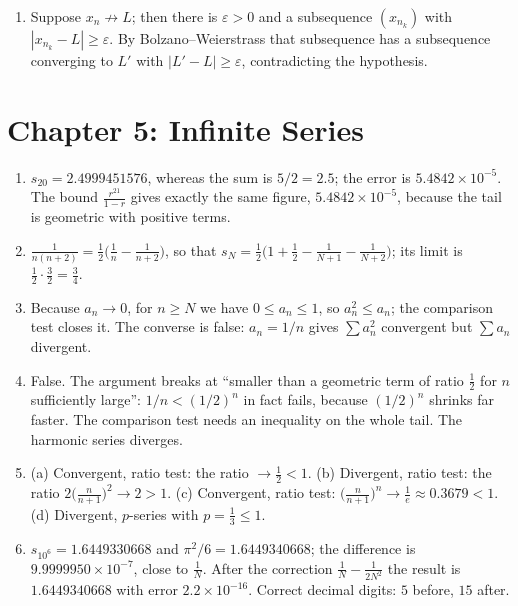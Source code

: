 \begin{enumerate}[label=\textbf{4.\arabic*}]
  \item Suppose $x_{n}\not\to L$; then there is $\varepsilon>0$ and a subsequence
        $(x_{n_{k}})$ with $|x_{n_{k}}-L|\ge\varepsilon$. By
        Bolzano--Weierstrass that subsequence has a subsequence converging to $L'$ with
        $|L'-L|\ge\varepsilon$, contradicting the hypothesis.
\end{enumerate}

\section*{Chapter 5: Infinite Series}
\begin{enumerate}[label=\textbf{5.\arabic*}]
  \item $s_{20}=2. 4999451576$, whereas the sum is $5/2=2. 5$; the error is
        $5. 4842\times10^{-5}$. The bound $\frac{r^{21}}{1-r}$ gives exactly the same
        figure, $5. 4842\times10^{-5}$, because the tail is geometric with positive terms.

  \item $\frac{1}{n(n+2)}=\frac12\bigl(\frac1n-\frac1{n+2}\bigr)$, so that
        $s_{N}=\frac12\bigl(1+\frac12-\frac{1}{N+1}-\frac{1}{N+2}\bigr)$; its limit is
        $\frac12\cdot\frac32=\frac34$.

  \item Because $a_{n}\to0$, for $n\ge N$ we have $0\le a_{n}\le1$, so
        $a_{n}^{2}\le a_{n}$; the comparison test closes it. The converse is false:
        $a_{n}=1/n$ gives $\sum a_{n}^{2}$ convergent but $\sum a_{n}$ divergent.

  \item False. The argument breaks at ``smaller than a geometric term of ratio $\tfrac12$ for
        $n$ sufficiently large'': $1/n<(1/2)^{n}$ in fact fails, because $(1/2)^{n}$ shrinks
        far faster. The comparison test needs an inequality on the whole tail. The
        harmonic series diverges.

  \item (a) Convergent, ratio test: the ratio $\to\tfrac12<1$. (b) Divergent, ratio test:
        the ratio $2\bigl(\frac{n}{n+1}\bigr)^{2}\to2>1$. (c) Convergent, ratio test:
        $\bigl(\frac{n}{n+1}\bigr)^{n}\to\frac1e\approx0. 3679<1$. (d) Divergent,
        $p$-series with $p=\tfrac13\le1$.

  \item $s_{10^{6}}=1. 6449330668$ and $\pi^{2}/6=1. 6449340668$; the difference is
        $9. 9999950\times10^{-7}$, close to $\frac1N$. After the correction
        $\frac1N-\frac{1}{2N^{2}}$ the result is $1. 6449340668$ with error
        $2. 2\times10^{-16}$. Correct decimal digits: $5$ before, $15$ after.


\end{enumerate}
